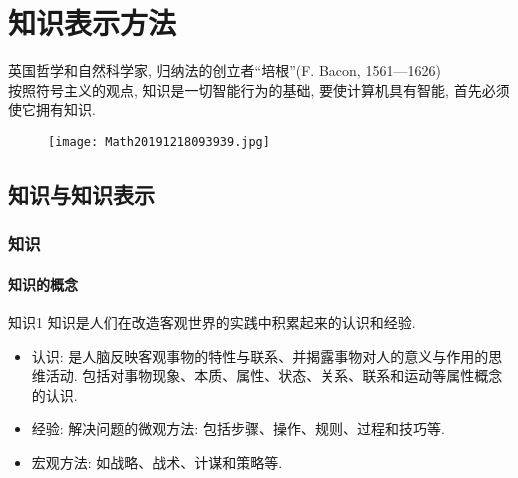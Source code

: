 \chapter{知识表示方法}\label{AIchap2}
\begin{tcolorbox}[colback=white!50,colframe=orange!50,title=知 识 就 是 力 量]
\begin{center}
   英国哲学和自然科学家, 归纳法的创立者“培根”(F. Bacon, 1561—1626)\hfill\\
   按照符号主义的观点, 知识是一切智能行为的基础, 要使计算机具有智能, 首先必须使它拥有知识.
\end{center}
\end{tcolorbox}
\begin{figure}[H]
\centering
\texttt{[image: Math20191218093939.jpg]}
\label{Math20191218093939}
\end{figure}
\newpage
\section{知识与知识表示}
\subsection{知识}
\subsubsection{知识的概念}
\begin{mydef}{知识}{1}
知识是人们在改造客观世界的实践中积累起来的认识和经验.
\end{mydef}
\begin{itemize}
\item  认识: 是人脑反映客观事物的特性与联系、并揭露事物对人的意义与作用的思维活动. 包括对事物现象、本质、属性、状态、关系、联系和运动等属性概念的认识.
\item  经验: 解决问题的微观方法: 包括步骤、操作、规则、过程和技巧等.
\item  宏观方法: 如战略、战术、计谋和策略等.
\end{itemize}
